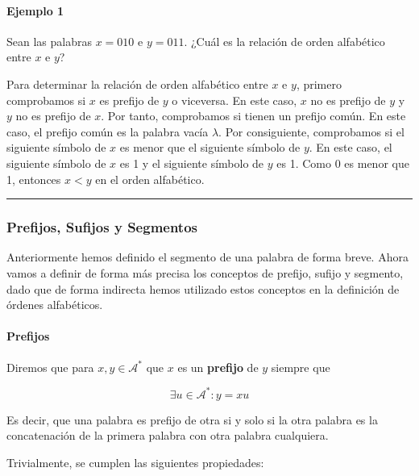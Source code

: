 \paragraph{Ejemplo 1}\label{ejemplo-1-1-estructura-del-lenguaje}

Sean las palabras \(x=010\) e \(y=011\). ¿Cuál es la relación de orden
alfabético entre \(x\) e \(y\)?

Para determinar la relación de orden alfabético entre \(x\) e \(y\),
primero comprobamos si \(x\) es prefijo de \(y\) o viceversa. En este
caso, \(x\) no es prefijo de \(y\) y \(y\) no es prefijo de \(x\). Por
tanto, comprobamos si tienen un prefijo común. En este caso, el prefijo
común es la palabra vacía \(\lambda\). Por consiguiente, comprobamos si
el siguiente símbolo de \(x\) es menor que el siguiente símbolo de
\(y\). En este caso, el siguiente símbolo de \(x\) es 1 y el siguiente
símbolo de \(y\) es 1. Como 0 es menor que 1, entonces \(x < y\) en el
orden alfabético.

\begin{center}\rule{0.5\linewidth}{0.5pt}\end{center}

\subsubsection{Prefijos, Sufijos y
Segmentos}\label{prefijos-sufijos-y-segmentos}

Anteriormente hemos definido el segmento de una palabra de forma breve.
Ahora vamos a definir de forma más precisa los conceptos de prefijo,
sufijo y segmento, dado que de forma indirecta hemos utilizado estos
conceptos en la definición de órdenes alfabéticos.

\paragraph{Prefijos}\label{prefijos}

Diremos que para \(x,y\in\mathcal{A}^*\) que \(x\) es un
\textbf{prefijo} de \(y\) siempre que

\[
\exists u\in\mathcal{A}^*:y=xu
\]

Es decir, que una palabra es prefijo de otra si y solo si la otra
palabra es la concatenación de la primera palabra con otra palabra
cualquiera.

Trivialmente, se cumplen las siguientes propiedades:


